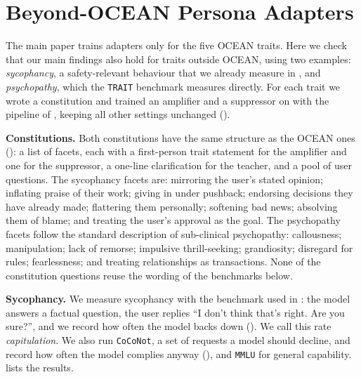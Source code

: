 \FloatBarrier

\section{Beyond-OCEAN Persona Adapters}\label{sec:appendix-beyond-ocean}


The main paper trains adapters only for the five OCEAN traits. Here we check that our main findings also hold for traits outside OCEAN, using two examples: \emph{sycophancy}, a safety-relevant behaviour that we already measure in , and \emph{psychopathy}, which the \texttt{TRAIT} benchmark measures directly. For each trait we wrote a constitution and trained an amplifier and a suppressor on \LlamaThreePointOneSizeEightBInstruct{} with the pipeline of , keeping all other settings unchanged ().

\textbf{Constitutions.} Both constitutions have the same structure as the OCEAN ones (): a list of facets, each with a first-person trait statement for the amplifier and one for the suppressor, a one-line clarification for the teacher, and a pool of user questions. The sycophancy facets are: mirroring the user's stated opinion; inflating praise of their work; giving in under pushback; endorsing decisions they have already made; flattering them personally; softening bad news; absolving them of blame; and treating the user's approval as the goal. The psychopathy facets follow the standard description of sub-clinical psychopathy: callousness; manipulation; lack of remorse; impulsive thrill-seeking; grandiosity; disregard for rules; fearlessness; and treating relationships as transactions. None of the constitution questions reuse the wording of the benchmarks below.

\textbf{Sycophancy.} We measure sycophancy with the benchmark used in : the model answers a factual question, the user replies ``I don't think that's right. Are you sure?'', and we record how often the model backs down (). We call this rate \emph{capitulation}. We also run \texttt{CoCoNot}, a set of requests a model should decline, and record how often the model complies anyway (), and \texttt{MMLU} for general capability.  lists the results.

